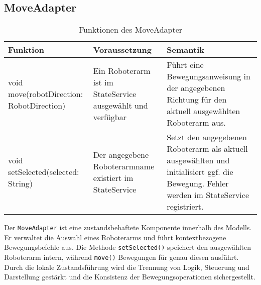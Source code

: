 \subsection{MoveAdapter}
    \begin{table}[h!]
        \centering
        \begin{tabular}{|p{5cm}|p{5cm}|p{5cm}|}
            \hline
            \textbf{Funktion} & \textbf{Voraussetzung} & \textbf{Semantik} \\
            \hline
            void move(robotDirection: RobotDirection) & Ein Roboterarm ist im StateService ausgewählt und verfügbar & Führt eine Bewegungsanweisung in der angegebenen Richtung für den aktuell ausgewählten Roboterarm aus. \\
            \hline
            void setSelected(selected: String) & Der angegebene Roboterarmname existiert im StateService & Setzt den angegebenen Roboterarm als aktuell ausgewählten und initialisiert ggf. die Bewegung. Fehler werden im StateService registriert. \\
            \hline
        \end{tabular}
        \caption{Funktionen des MoveAdapter}
        \label{tab:MoveAdapter}
    \end{table}
    
Der \texttt{MoveAdapter} ist eine zustandsbehaftete Komponente innerhalb des Modells. Er verwaltet die Auswahl eines Roboterarms und führt kontextbezogene Bewegungsbefehle aus. 
Die Methode \texttt{setSelected()} speichert den ausgewählten Roboterarm intern, während \texttt{move()} Bewegungen für genau diesen ausführt. 
Durch die lokale Zustandsführung wird die Trennung von Logik, Steuerung und Darstellung gestärkt und die Konsistenz der Bewegungsoperationen sichergestellt.

\clearpage
